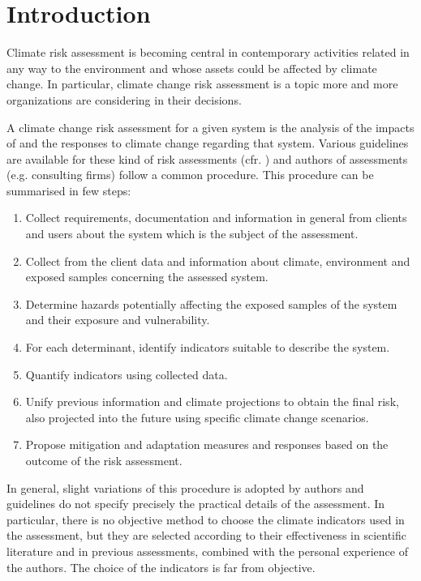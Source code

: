 \section{Introduction}
Climate risk assessment is becoming central in contemporary activities related in any way to the environment and whose assets could be affected by climate change.
In particular, climate change risk assessment is a topic more and more organizations are considering in their decisions.

A climate change risk assessment for a given system is the analysis of the impacts of and the responses to climate change regarding that system. Various guidelines are available for these kind of risk assessments (cfr. \cite{2021ISO14091,2024EEAExecutiveSummary,2017GIZTheVulnerability}) and authors of assessments (e.g. consulting firms) follow a common procedure.
This procedure can be summarised in few steps:
\begin{enumerate}
  \item Collect requirements, documentation and information in general from clients and users about the system which is the subject of the assessment.
  \item Collect from the client data and information about climate, environment and exposed samples concerning the assessed system.
  \item Determine hazards potentially affecting the exposed samples of the system and their exposure and vulnerability.
  \item For each determinant, identify indicators suitable to describe the system.
  \item Quantify indicators using collected data.
  \item Unify previous information and climate projections to obtain the final risk, also projected into the future using specific climate change scenarios.
  \item Propose mitigation and adaptation measures and responses based on the outcome of the risk assessment.
\end{enumerate}

In general, slight variations of this procedure is adopted by authors and guidelines do not specify precisely the practical details of the assessment. In particular, there is no objective method to choose the climate indicators used in the assessment, but they are selected according to their effectiveness in scientific literature and in previous assessments, combined with the personal experience of the authors. The choice of the indicators is far from objective.



